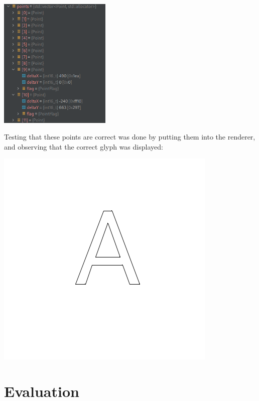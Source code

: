 \documentclass{report}
\begin{document}
\begin{center}
\includegraphics[width=0.4\textwidth]{pointss}
\end{center}

Testing that these points are correct was done by putting them into the
renderer, and observing that the correct glyph was displayed:

\begin{center}
\includegraphics[width=.45\textwidth]{sample1}
\end{center}

\chapter{Evaluation}
\end{document}
